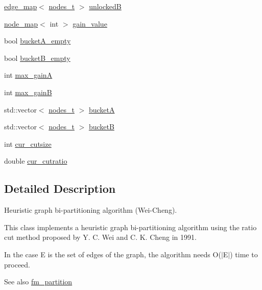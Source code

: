 \begin{DoxyCompactItemize}
\mbox{\hyperlink{classedge__map}{edge\+\_\+map}}$<$ \mbox{\hyperlink{edge_8h_a22ac17689106ba21a84e7bc54d1199d6}{nodes\+\_\+t}} $>$ \mbox{\hyperlink{classratio__cut__partition_af7c877d8c6e9b533ab34cde1c6690b25}{unlockedB}}
\item 
\mbox{\hyperlink{classnode__map}{node\+\_\+map}}$<$ int $>$ \mbox{\hyperlink{classratio__cut__partition_af24ff191abbb0578f0bfc54fef5f6d45}{gain\+\_\+value}}
\item 
bool \mbox{\hyperlink{classratio__cut__partition_a2e3f25066f798f28e9e5646f866ffc1c}{bucket\+A\+\_\+empty}}
\item 
bool \mbox{\hyperlink{classratio__cut__partition_af4bbd571d19340f92519240b96b52702}{bucket\+B\+\_\+empty}}
\item 
int \mbox{\hyperlink{classratio__cut__partition_ae69ef6876be68d5752d247564a524c6a}{max\+\_\+gainA}}
\item 
int \mbox{\hyperlink{classratio__cut__partition_af184ffdb46e49b1fc95faa1e6a91cc8e}{max\+\_\+gainB}}
\item 
std\+::vector$<$ \mbox{\hyperlink{edge_8h_a22ac17689106ba21a84e7bc54d1199d6}{nodes\+\_\+t}} $>$ \mbox{\hyperlink{classratio__cut__partition_ac9c2f4f99e1042d69f44c1a1f79d4a2f}{bucketA}}
\item 
std\+::vector$<$ \mbox{\hyperlink{edge_8h_a22ac17689106ba21a84e7bc54d1199d6}{nodes\+\_\+t}} $>$ \mbox{\hyperlink{classratio__cut__partition_a68f6fa1360b848a0a046e1adf3827f05}{bucketB}}
\item 
int \mbox{\hyperlink{classratio__cut__partition_aa01f2d6257fff28739e2431fe826ef71}{cur\+\_\+cutsize}}
\item 
double \mbox{\hyperlink{classratio__cut__partition_a9dad324884cef5bcdd50122fc98e0860}{cur\+\_\+cutratio}}
\end{DoxyCompactItemize}


\subsection{Detailed Description}
Heuristic graph bi-\/partitioning algorithm (Wei-\/\+Cheng). 

This class implements a heuristic graph bi-\/partitioning algorithm using the ratio cut method proposed by Y. C. Wei and C. K. Cheng in 1991.

In the case E is the set of edges of the graph, the algorithm needs {\ttfamily O($\vert$\+E$\vert$)} time to proceed.

\begin{DoxySeeAlso}{See also}
\mbox{\hyperlink{classfm__partition}{fm\+\_\+partition}} 
\end{DoxySeeAlso}


